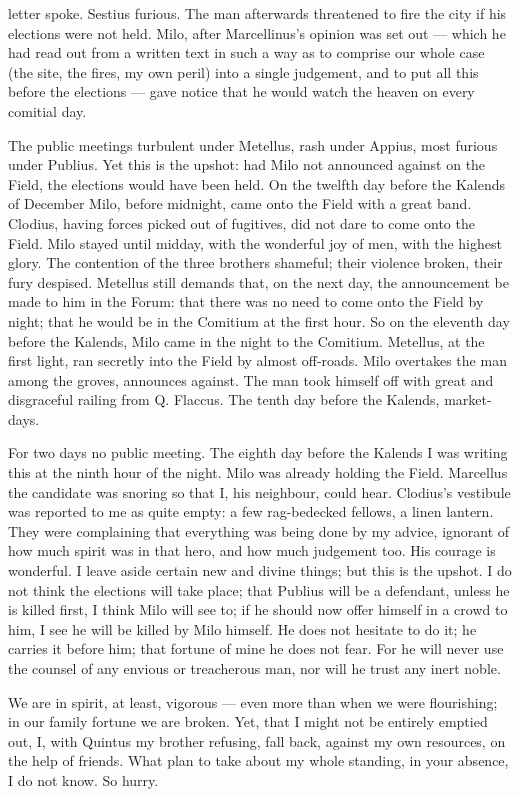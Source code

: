 letter spoke. Sestius furious. The man afterwards threatened to fire the city if his elections were not held. Milo, after Marcellinus's opinion was set out --- which he had read out from a written text in such a way as to comprise our whole case (the site, the fires, my own peril) into a single judgement, and to put all this before the elections --- gave notice that he would watch the heaven on every comitial day.

 The public meetings turbulent under Metellus, rash under Appius, most furious under Publius. Yet this is the upshot: had Milo not announced against on the Field, the elections would have been held. On the twelfth day before the Kalends of December Milo, before midnight, came onto the Field with a great band. Clodius, having forces picked out of fugitives, did not dare to come onto the Field. Milo stayed until midday, with the wonderful joy of men, with the highest glory. The contention of the three brothers shameful; their violence broken, their fury despised. Metellus still demands that, on the next day, the announcement be made to him in the Forum: that there was no need to come onto the Field by night; that he would be in the Comitium at the first hour. So on the eleventh day before the Kalends, Milo came in the night to the Comitium. Metellus, at the first light, ran secretly into the Field by almost off-roads. Milo overtakes the man among the groves, announces against. The man took himself off with great and disgraceful railing from Q. Flaccus. The tenth day before the Kalends, market-days.

 For two days no public meeting. The eighth day before the Kalends I was writing this at the ninth hour of the night. Milo was already holding the Field. Marcellus the candidate was snoring so that I, his neighbour, could hear. Clodius's vestibule was reported to me as quite empty: a few rag-bedecked fellows, a linen lantern. They were complaining that everything was being done by my advice, ignorant of how much spirit was in that hero, and how much judgement too. His courage is wonderful. I leave aside certain new and divine things; but this is the upshot. I do not think the elections will take place; that Publius will be a defendant, unless he is killed first, I think Milo will see to; if he should now offer himself in a crowd to him, I see he will be killed by Milo himself. He does not hesitate to do it; he carries it before him; that fortune of mine he does not fear. For he will never use the counsel of any envious or treacherous man, nor will he trust any inert noble.

 We are in spirit, at least, vigorous --- even more than when we were flourishing; in our family fortune we are broken. Yet, that I might not be entirely emptied out, I, with Quintus my brother refusing, fall back, against my own resources, on the help of friends. What plan to take about my whole standing, in your absence, I do not know. So hurry.
